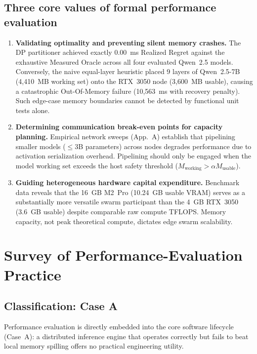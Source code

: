 \documentclass[10pt,a4paper]{article}
\begin{document}
\subsection{Three core values of formal performance evaluation}
\begin{enumerate}
\item \textbf{Validating optimality and preventing silent memory crashes.} The DP partitioner achieved exactly 0.00~ms Realized Regret against the exhaustive Measured Oracle across all four evaluated Qwen~2.5 models. Conversely, the naive equal-layer heuristic placed 9 layers of Qwen~2.5-7B (4{,}410~MB working set) onto the RTX~3050 node (3{,}600~MB usable), causing a catastrophic Out-Of-Memory failure (10{,}563~ms with recovery penalty). Such edge-case memory boundaries cannot be detected by functional unit tests alone.
\item \textbf{Determining communication break-even points for capacity planning.} Empirical network sweeps (App.~A) establish that pipelining smaller models ($\le 3$B parameters) across nodes degrades performance due to activation serialization overhead. Pipelining should only be engaged when the model working set exceeds the host safety threshold ($M_{\text{working}} > \alpha M_{\text{usable}}$).
\item \textbf{Guiding heterogeneous hardware capital expenditure.} Benchmark data reveals that the 16~GB M2~Pro (10.24~GB usable VRAM) serves as a substantially more versatile swarm participant than the 4~GB RTX~3050 (3.6~GB usable) despite comparable raw compute TFLOPS. Memory capacity, not peak theoretical compute, dictates edge swarm scalability.
\end{enumerate}

\section{Survey of Performance-Evaluation Practice}

\subsection{Classification: Case A}
Performance evaluation is directly embedded into the core software lifecycle (Case~A): a distributed inference engine that operates correctly but fails to beat local memory spilling offers no practical engineering utility.
\end{document}

